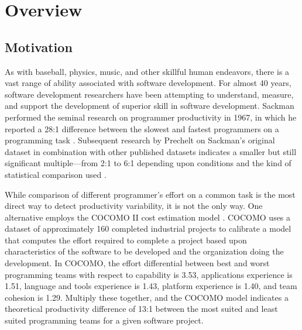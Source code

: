 
\section{Overview}

\subsection{Motivation}
As with baseball, physics, music, and other skillful human endeavors, there
is a vast range of ability associated with software development.  For
almost 40 years, software development researchers have been attempting to
understand, measure, and support the development of superior skill in
software development.  Sackman performed the seminal research on programmer
productivity in 1967, in which he reported a 28:1 difference between the
slowest and fastest programmers on a programming task \cite{Sackman68}.
Subsequent research by Prechelt on Sackman's original dataset in
combination with other published datasets indicates a smaller but still
significant multiple---from 2:1 to 6:1 depending upon conditions and the
kind of statistical comparison used \cite{Prechelt99}.

While comparison of different programmer's effort on a common task is the
most direct way to detect productivity variability, it is not the only way.
One alternative  employs the COCOMO II cost estimation model
\cite{Boehm00}. COCOMO uses a dataset of approximately 160 completed
industrial projects to calibrate a model that computes the effort required
to complete a project based upon characteristics of the software to be
developed and the organization doing the development.  In COCOMO, the
effort differential between best and worst programming teams with respect
to capability is 3.53, applications experience is 1.51, language and tools
experience is 1.43, platform experience is 1.40, and team cohesion is 1.29.
Multiply these together, and the COCOMO model indicates a theoretical
productivity difference of 13:1 between the most suited and least suited
programming teams for a given software project. 

